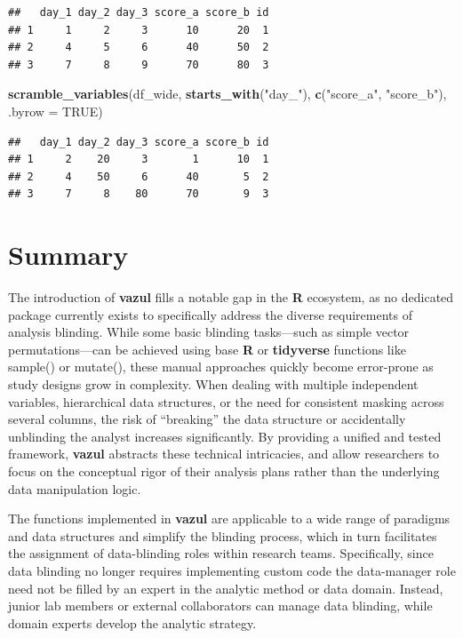 \documentclass[
  english,
  man,floatsintext]{apa6}
\newenvironment{Shaded}{\begin{snugshade}}{\end{snugshade}}
\newcommand{\AttributeTok}[1]{\textcolor[rgb]{0.13,0.29,0.53}{#1}}
\newcommand{\ConstantTok}[1]{\textcolor[rgb]{0.56,0.35,0.01}{#1}}
\newcommand{\FunctionTok}[1]{\textcolor[rgb]{0.13,0.29,0.53}{\textbf{#1}}}
\newcommand{\NormalTok}[1]{#1}
\newcommand{\StringTok}[1]{\textcolor[rgb]{0.31,0.60,0.02}{#1}}
\begin{document}
\begin{verbatim}
##   day_1 day_2 day_3 score_a score_b id
## 1     1     2     3      10      20  1
## 2     4     5     6      40      50  2
## 3     7     8     9      70      80  3
\end{verbatim}

\begin{Shaded}
\begin{Highlighting}[]
\FunctionTok{scramble\_variables}\NormalTok{(df\_wide, }\FunctionTok{starts\_with}\NormalTok{(}\StringTok{"day\_"}\NormalTok{), }\FunctionTok{c}\NormalTok{(}\StringTok{"score\_a"}\NormalTok{, }\StringTok{"score\_b"}\NormalTok{), }\AttributeTok{.byrow =} \ConstantTok{TRUE}\NormalTok{)}
\end{Highlighting}
\end{Shaded}

\begin{verbatim}
##   day_1 day_2 day_3 score_a score_b id
## 1     2    20     3       1      10  1
## 2     4    50     6      40       5  2
## 3     7     8    80      70       9  3
\end{verbatim}

\section{Summary}\label{summary}

The introduction of \textbf{vazul} fills a notable gap in the \textbf{R} ecosystem, as no dedicated package currently exists to specifically address the diverse requirements of analysis blinding. While some basic blinding tasks---such as simple vector permutations---can be achieved using base \textbf{R} or \textbf{tidyverse} functions like sample() or mutate(), these manual approaches quickly become error-prone as study designs grow in complexity. When dealing with multiple independent variables, hierarchical data structures, or the need for consistent masking across several columns, the risk of ``breaking'' the data structure or accidentally unblinding the analyst increases significantly. By providing a unified and tested framework, \textbf{vazul} abstracts these technical intricacies, and allow researchers to focus on the conceptual rigor of their analysis plans rather than the underlying data manipulation logic.

The functions implemented in \textbf{vazul} are applicable to a wide range of paradigms and data structures and simplify the blinding process, which in turn facilitates the assignment of data-blinding roles within research teams. Specifically, since data blinding no longer requires implementing custom code the data-manager role need not be filled by an expert in the analytic method or data domain. Instead, junior lab members or external collaborators can manage data blinding, while domain experts develop the analytic strategy.
\end{document}
